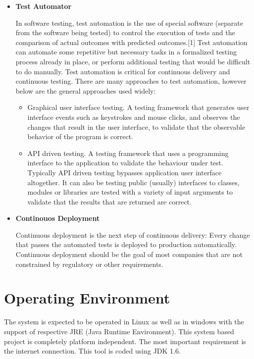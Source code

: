 \documentclass[12pt,a4paper,oneside]{report}
\begin{document}
{\begin{itemize}
Jenkins is an automation engine with an unparalleled plugin ecosystem to support all of your favorite tools in your delivery pipelines, whether your goal is continuous integration, automated testing, or continuous delivery. 
 \item  \textbf{Test Automator}
\par In software testing, test automation is the use of special software (separate from the software being tested) to control the execution of tests and the comparison of actual outcomes with predicted outcomes.[1] Test automation can automate some repetitive but necessary tasks in a formalized testing process already in place, or perform additional testing that would be difficult to do manually. Test automation is critical for continuous delivery and continuous testing. There are many approaches to test automation, however below are the general approaches used widely:

\begin{itemize}
\item Graphical user interface testing. A testing framework that generates user interface events such as keystrokes and mouse clicks, and observes the changes that result in the user interface, to validate that the observable behavior of the program is correct.
\item API driven testing. A testing framework that uses a programming interface to the application to validate the behaviour under test. Typically API driven testing bypasses application user interface altogether. It can also be testing public (usually) interfaces to classes, modules or libraries are tested with a variety of input arguments to validate that the results that are returned are correct.
\end{itemize}


\item \textbf{Continouos Deployment}
\par Continuous deployment is the next step of continuous delivery: Every change that passes the automated tests is deployed to production automatically. Continuous deployment should be the goal of most companies that are not constrained by regulatory or other requirements.

\end{itemize}

 
\section{Operating Environment}
The system is expected to be operated in Linux as well as in windows with the support of
respective JRE (Java Runtime Environment). This system based project is completely platform
independent. The most important requirement is the internet connection. This tool is coded
using JDK 1.6.
}
\end{document}
